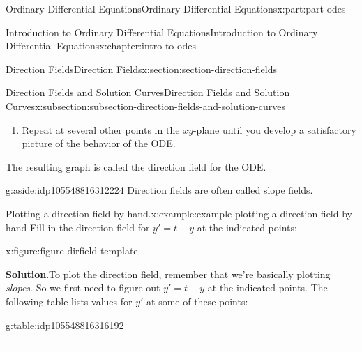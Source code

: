 \documentclass[twoside,10pt,]{book}
\newcommand{\blocktitlefont}{\relax}
\newcommand{\tabularfont}{\relax}
\numberwithin{equation}{part}
\newcommand{\hrulethick} {\noalign{\hrule height 0.11em}}
\begin{document}
\begin{partptx}{Ordinary Differential Equations}{}{Ordinary Differential Equations}{}{}{x:part:part-odes}
\begin{chapterptx}{Introduction to Ordinary Differential Equations}{}{Introduction to Ordinary Differential Equations}{}{}{x:chapter:intro-to-odes}
\begin{sectionptx}{Direction Fields}{}{Direction Fields}{}{}{x:section:section-direction-fields}
\begin{subsectionptx}{Direction Fields and Solution Curves}{}{Direction Fields and Solution Curves}{}{}{x:subsection:subsection-direction-fields-and-solution-curves}
\begin{enumerate}
\item{}Repeat at several other points in the \(xy\)-plane until you develop a satisfactory picture of the behavior of the ODE.%
\end{enumerate}
The resulting graph is called the direction field for the ODE.%
\begin{aside}{}{g:aside:idp105548816312224}%
Direction fields are often called slope fields.%
\end{aside}
\begin{example}{Plotting a direction field by hand.}{x:example:example-plotting-a-direction-field-by-hand}%
Fill in the direction field for \(y' = t - y\) at the indicated points:%
\begin{figureptx}{}{x:figure:figure-dirfield-template}{}%
\begin{image}{0.25}{0.5}{0.25}%
%
\end{image}%
\tcblower
\end{figureptx}%
\par\smallskip%
\noindent\textbf{\blocktitlefont Solution}.\hypertarget{g:solution:idp105548816314656}{}\quad{}To plot the direction field, remember that we're basically plotting \emph{slopes}. So we first need to figure out \(y' = t-y\) at the indicated points. The following table lists values for \(y'\) at some of these points: \begin{tableptx}{\textbf{}}{g:table:idp105548816316192}{}%
\centering%
{\tabularfont%
\begin{tabular}{cc}\hrulethick

\end{tabular}}
\end{tableptx}
\end{example}
\end{subsectionptx}
\end{sectionptx}
\end{chapterptx}
\end{partptx}
\end{document}
